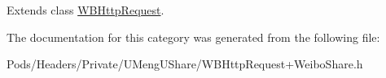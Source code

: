 Extends class \mbox{\hyperlink{interface_w_b_http_request_ac75a0b99ef6dba004af29cd7c2498149}{W\+B\+Http\+Request}}.



The documentation for this category was generated from the following file\+:\begin{DoxyCompactItemize}
\item 
Pods/\+Headers/\+Private/\+U\+Meng\+U\+Share/W\+B\+Http\+Request+\+Weibo\+Share.\+h\end{DoxyCompactItemize}
